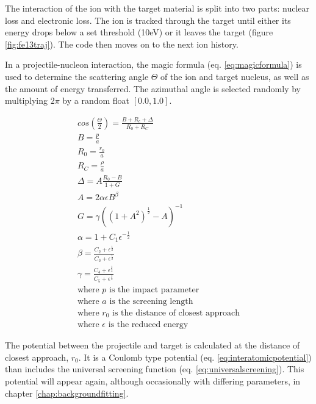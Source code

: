 The interaction of the ion with the target material is split into two parts: nuclear loss and electronic loss.  The ion is tracked through the target until either its energy drops below a set threshold (10eV) or it leaves the target (figure \ref{fig:fe13traj}).  The code then moves on to the next ion history.

In a projectile-nucleon interaction, the magic formula (eq. \ref{eq:magicformula})\cite{srimbook} is used to determine the scattering angle $\Theta$ of the ion and target nucleus, as well as the amount of energy transferred.  The azimuthal angle is selected randomly by multiplying $2\pi$ by a random float $[0.0, 1.0]$.

\begin{equation}
\begin{split}
cos \left(\frac{\Theta}{2}\right) = \frac{B + R_c + \Delta}{R_0 + R_C} \\
B = \frac{p}{a} \\
R_0 = \frac{r_0}{a} \\
R_C = \frac{\rho}{a} \\
\Delta = A \frac{R_0 - B}{1 + G} \\
A = 2 \alpha \epsilon B^\beta \\
G = \gamma \left(\left(1+A^2\right)^{\frac{1}{2}}-A\right)^{-1} \\
\alpha = 1 + C_1 \epsilon^{-\frac{1}{2}} \\
\beta = \frac{C_2 + \epsilon^{\frac{1}{2}}}{C_3 + \epsilon^{\frac{1}{2}}} \\
\gamma = \frac{C_4 + \epsilon^{\frac{1}{2}}}{C_5 + \epsilon^{\frac{1}{2}}} \\
\text{where } p \text{ is the impact parameter} \\
\text{where } a \text{ is the screening length} \\
\text{where } r_0 \text{ is the distance of closest approach} \\
\text{where } \epsilon \text{ is the reduced energy} 
\end{split}
\label{eq:magicformula}
\end{equation}

The potential between the projectile and target is calculated at the distance of closest approach, $r_0$.  It is a Coulomb type potential (eq. \ref{eq:interatomicpotential}) than includes the universal screening function (eq. \ref{eq:universalscreening}).  This potential will appear again, although occasionally with differing parameters, in chapter \ref{chap:backgroundfitting}.

